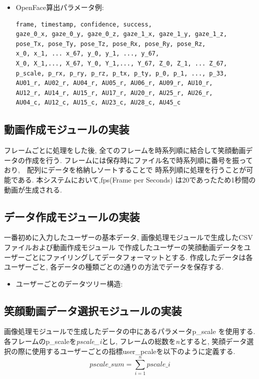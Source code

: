 \begin{itemize}
\item OpenFace算出パラメータ例:
\begin{lstlisting}
frame, timestamp, confidence, success,
gaze_0_x, gaze_0_y, gaze_0_z, gaze_1_x, gaze_1_y, gaze_1_z,
pose_Tx, pose_Ty, pose_Tz, pose_Rx, pose_Ry, pose_Rz,
x_0, x_1, ... x_67, y_0, y_1, ..., y_67,
X_0, X_1,..., X_67, Y_0, Y_1,..., Y_67, Z_0, Z_1, ... Z_67,
p_scale, p_rx, p_ry, p_rz, p_tx, p_ty, p_0, p_1, ..., p_33,
AU01_r, AU02_r, AU04_r, AU05_r, AU06_r, AU09_r, AU10_r,
AU12_r, AU14_r, AU15_r, AU17_r, AU20_r, AU25_r, AU26_r,
AU04_c, AU12_c, AU15_c, AU23_c, AU28_c, AU45_c
\end{lstlisting}
\end{itemize}

\subsection{動画作成モジュールの実装}
フレームごとに処理をした後, 全てのフレームを時系列順に結合して笑顔動画データの作成を行う.
フレームには保存時にファイル名で時系列順に番号を振っており,　配列にデータを格納しソートすることで
時系列順に処理を行うことが可能である.
本システムにおいて,fps(Frame per Seconds) は20であったため1秒間の動画が生成される.

\subsection{データ作成モジュールの実装}
一番初めに入力したユーザーの基本データ, 画像処理モジュールで生成したCSVファイルおよび動画作成モジュール
で作成したユーザーの笑顔動画データをユーザーごとにファイリングしてデータフォーマットとする.
作成したデータは各ユーザーごと, 各データの種類ごとの2通りの方法でデータを保存する.

\begin{itemize}
\item ユーザーごとのデータツリー構造:
\end{itemize}

\subsection{笑顔動画データ選択モジュールの実装}
画像処理モジュールで生成したデータの中にあるパラメータp\_scale を使用する.
各フレームのp\_scaleを{\sl pscale\_i}とし, フレームの総数を{\sl n}とすると,
笑顔データ選択の際に使用するユーザーごとの指標user\_pcaleを以下のように定義する.
\begin{equation}
\label{pscalesum}
pscale\_sum = \sum_{i=1}^ n pscale\_i
\end{equation}

